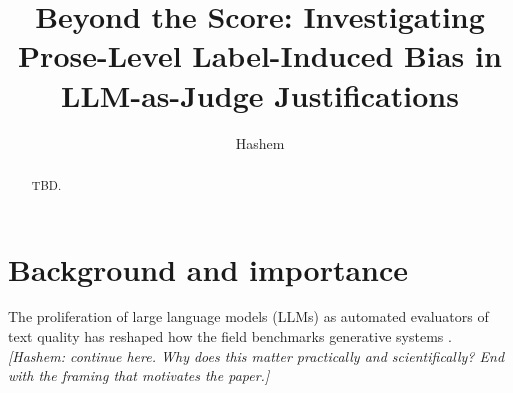\documentclass[sigconf,authoryear,nonacm]{acmart}
\begin{document}
\title{Beyond the Score: Investigating Prose-Level Label-Induced Bias in LLM-as-Judge Justifications}


\author{Hashem}

\begin{abstract}
TBD.
\end{abstract}


\maketitle

\section{Background and importance}
\label{sec:background}


The proliferation of large language models (LLMs) as automated evaluators
of text quality has reshaped how the field benchmarks generative systems
\citep{zheng2023judging}. \emph{[Hashem: continue here. Why does this matter
practically and scientifically? End with the framing that motivates the
paper.]}
\end{document}
